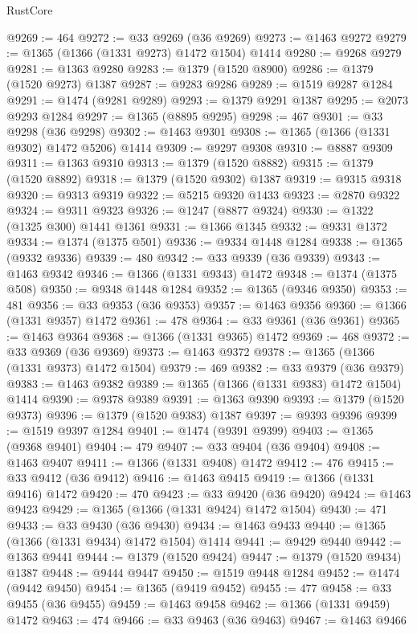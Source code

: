 \begin{lexlean}{RustCore}
\begin{coremodule}
@9269 := 464
@9272 := @33 @9269 (@36 @9269)
@9273 := @1463 @9272
@9279 := @1365 (@1366 (@1331 @9273) @1472 @1504) @1414
@9280 := @9268 @9279
@9281 := @1363 @9280
@9283 := @1379 (@1520 @8900)
@9286 := @1379 (@1520 @9273) @1387
@9287 := @9283 @9286
@9289 := @1519 @9287 @1284
@9291 := @1474 (@9281 @9289)
@9293 := @1379 @9291 @1387
@9295 := @2073 @9293 @1284
@9297 := @1365 (@8895 @9295)
@9298 := 467
@9301 := @33 @9298 (@36 @9298)
@9302 := @1463 @9301
@9308 := @1365 (@1366 (@1331 @9302) @1472 @5206) @1414
@9309 := @9297 @9308
@9310 := @8887 @9309
@9311 := @1363 @9310
@9313 := @1379 (@1520 @8882)
@9315 := @1379 (@1520 @8892)
@9318 := @1379 (@1520 @9302) @1387
@9319 := @9315 @9318
@9320 := @9313 @9319
@9322 := @5215 @9320 @1433
@9323 := @2870 @9322
@9324 := @9311 @9323
@9326 := @1247 (@8877 @9324)
@9330 := @1322 (@1325 @300) @1441 @1361
@9331 := @1366 @1345
@9332 := @9331 @1372
@9334 := @1374 (@1375 @501)
@9336 := @9334 @1448 @1284
@9338 := @1365 (@9332 @9336)
@9339 := 480
@9342 := @33 @9339 (@36 @9339)
@9343 := @1463 @9342
@9346 := @1366 (@1331 @9343) @1472
@9348 := @1374 (@1375 @508)
@9350 := @9348 @1448 @1284
@9352 := @1365 (@9346 @9350)
@9353 := 481
@9356 := @33 @9353 (@36 @9353)
@9357 := @1463 @9356
@9360 := @1366 (@1331 @9357) @1472
@9361 := 478
@9364 := @33 @9361 (@36 @9361)
@9365 := @1463 @9364
@9368 := @1366 (@1331 @9365) @1472
@9369 := 468
@9372 := @33 @9369 (@36 @9369)
@9373 := @1463 @9372
@9378 := @1365 (@1366 (@1331 @9373) @1472 @1504)
@9379 := 469
@9382 := @33 @9379 (@36 @9379)
@9383 := @1463 @9382
@9389 := @1365 (@1366 (@1331 @9383) @1472 @1504) @1414
@9390 := @9378 @9389
@9391 := @1363 @9390
@9393 := @1379 (@1520 @9373)
@9396 := @1379 (@1520 @9383) @1387
@9397 := @9393 @9396
@9399 := @1519 @9397 @1284
@9401 := @1474 (@9391 @9399)
@9403 := @1365 (@9368 @9401)
@9404 := 479
@9407 := @33 @9404 (@36 @9404)
@9408 := @1463 @9407
@9411 := @1366 (@1331 @9408) @1472
@9412 := 476
@9415 := @33 @9412 (@36 @9412)
@9416 := @1463 @9415
@9419 := @1366 (@1331 @9416) @1472
@9420 := 470
@9423 := @33 @9420 (@36 @9420)
@9424 := @1463 @9423
@9429 := @1365 (@1366 (@1331 @9424) @1472 @1504)
@9430 := 471
@9433 := @33 @9430 (@36 @9430)
@9434 := @1463 @9433
@9440 := @1365 (@1366 (@1331 @9434) @1472 @1504) @1414
@9441 := @9429 @9440
@9442 := @1363 @9441
@9444 := @1379 (@1520 @9424)
@9447 := @1379 (@1520 @9434) @1387
@9448 := @9444 @9447
@9450 := @1519 @9448 @1284
@9452 := @1474 (@9442 @9450)
@9454 := @1365 (@9419 @9452)
@9455 := 477
@9458 := @33 @9455 (@36 @9455)
@9459 := @1463 @9458
@9462 := @1366 (@1331 @9459) @1472
@9463 := 474
@9466 := @33 @9463 (@36 @9463)
@9467 := @1463 @9466

\end{coremodule}
\end{lexlean}
